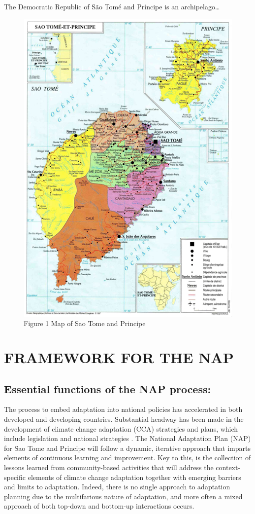 \documentclass[
]{book}
\begin{document}
The Democratic Republic of São Tomé and Príncipe is an archipelago\ldots{}

\begin{figure}
\centering
\includegraphics{images/map.png}
\caption{Figure 1 Map of Sao Tome and Principe}
\end{figure}

\hypertarget{framework-for-the-nap-1}{%
\chapter{FRAMEWORK FOR THE NAP}\label{framework-for-the-nap-1}}

\hypertarget{essential-functions-of-the-nap-process-1}{%
\section{Essential functions of the NAP process:}\label{essential-functions-of-the-nap-process-1}}

The process to embed adaptation into national policies has accelerated in both developed and developing countries. Substantial headway has been made in the development of climate change adaptation (CCA) strategies and plans, which include legislation and national strategies . The National Adaptation Plan (NAP) for Sao Tome and Principe will follow a dynamic, iterative approach that imparts elements of continuous learning and improvement. Key to this, is the collection of lessons learned from community-based activities that will address the context-specific elements of climate change adaptation together with emerging barriers and limits to adaptation. Indeed, there is no single approach to adaptation planning due to the multifarious nature of adaptation, and more often a mixed approach of both top-down and bottom-up interactions occurs.
\end{document}
